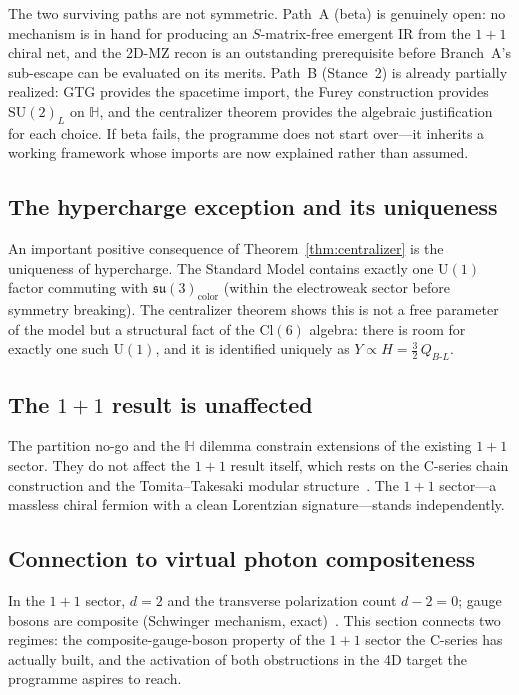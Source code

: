 \documentclass[aip,jmp,amsmath,amssymb,reprint,author-year]{revtex4-2}
\begin{document}
The two surviving paths are not symmetric.  Path~A (beta) is genuinely
open: no mechanism is in hand for producing an $S$-matrix-free emergent
IR from the $1{+}1$ chiral net, and the 2D-MZ recon is an outstanding
prerequisite before Branch~A's sub-escape can be evaluated on its merits.
Path~B (Stance~2) is already partially realized: GTG provides the
spacetime import, the Furey construction provides
$\mathrm{SU}(2)_L$ on $\mathbb{H}$, and the centralizer theorem provides
the algebraic justification for each choice.  If beta fails, the
programme does not start over---it inherits a working framework whose
imports are now explained rather than assumed.

\subsection{The hypercharge exception and its uniqueness}

An important positive consequence of Theorem~\ref{thm:centralizer} is the
uniqueness of hypercharge.  The Standard Model contains exactly one
$\mathrm{U}(1)$ factor commuting with $\mathfrak{su}(3)_{\mathrm{color}}$
(within the electroweak sector before symmetry breaking).  The centralizer
theorem shows this is not a free parameter of the model but a structural
fact of the $\mathrm{Cl}(6)$ algebra: there is room for exactly one such
$\mathrm{U}(1)$, and it is identified uniquely as $Y \propto H =
\tfrac{3}{2}\,Q_{B\text{-}L}$.

\subsection{The $1{+}1$ result is unaffected}

The partition no-go and the $\mathbb{H}$ dilemma constrain extensions of
the existing $1{+}1$ sector.  They do not affect the $1{+}1$ result
itself, which rests on the C-series chain construction and the
Tomita--Takesaki modular
structure~\citep{C4consolidation,C5delta}.  The $1{+}1$ sector---a
massless chiral fermion with a clean Lorentzian signature---stands
independently.

\subsection{Connection to virtual photon compositeness}

In the $1{+}1$ sector, $d = 2$ and the transverse polarization count
$d - 2 = 0$; gauge bosons are composite (Schwinger mechanism,
exact)~\citep{Schwinger1962}.  This section connects two regimes: the
composite-gauge-boson property of the $1{+}1$ sector the C-series has
actually built, and the activation of both obstructions in the 4D target
the programme aspires to reach.
\end{document}
